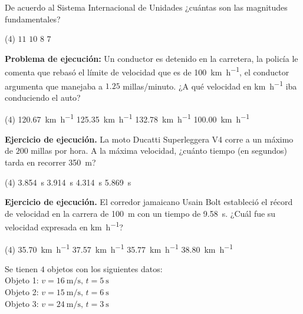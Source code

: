 \documentclass[12pt, letter]{exam}
\begin{document}


\newpage

\begin{questions}
    \question De acuerdo al Sistema Internacional de Unidades ¿cuántas son las magnitudes fundamentales?
     \begin{tasks}(4)
         \task $11$
         \task $10$
         \task $8$
         \task $7$
     \end{tasks}
    \question \textbf{Problema de ejecución:} Un conductor es detenido en la carretera, la policía le comenta que rebasó el límite de velocidad que es de \SI{100}{\kilo\meter\per\hour}, el conductor argumenta que manejaba a $1.25$ millas/minuto. ¿A qué velocidad en \unit{\kilo\meter\per\hour} iba conduciendo el auto?
    \begin{tasks}(4)
        \task \SI{120.67}{\kilo\meter\per\hour}
        \task \SI{125.35}{\kilo\meter\per\hour}
        \task \SI{132.78}{\kilo\meter\per\hour}
        \task \SI{100.00}{\kilo\meter\per\hour}
    \end{tasks}
    \question \textbf{Ejercicio de ejecución.} La moto Ducatti Superleggera V4 corre a un máximo de $200$ millas por hora. A la máxima velocidad, ¿cuánto tiempo (en segundos) tarda en recorrer \SI{350}{\meter}?
    \begin{tasks}(4)
        \task \SI{3.854}{\second}
        \task \SI{3.914}{\second}
        \task \SI{4.314}{\second}
        \task \SI{5.869}{\second}
    \end{tasks}
    \question \textbf{Ejercicio de ejecución.} El corredor jamaicano Usain Bolt estableció el récord de velocidad en la carrera de \SI{100}{\meter} con un tiempo de \SI{9.58}{\second}. ¿Cuál fue su velocidad expresada en \unit{\kilo\meter\per\hour}?
    \begin{tasks}(4)
        \task \SI{35.70}{\kilo\meter\per\hour}
        \task \SI{37.57}{\kilo\meter\per\hour}
        \task \SI{35.77}{\kilo\meter\per\hour}
        \task \SI{38.80}{\kilo\meter\per\hour}
    \end{tasks}
    \question Se tienen $4$ objetos con los siguientes datos: \\
    Objeto 1: $v = \SI{16}{\meter\per\second}, \, t = \SI{5}{\second}$ \\
    Objeto 2: $v = \SI{15}{\meter\per\second}, \, t = \SI{6}{\second}$ \\
    Objeto 3: $v = \SI{24}{\meter\per\second}, \, t = \SI{3}{\second}$ \\

\end{questions}
\end{document}
